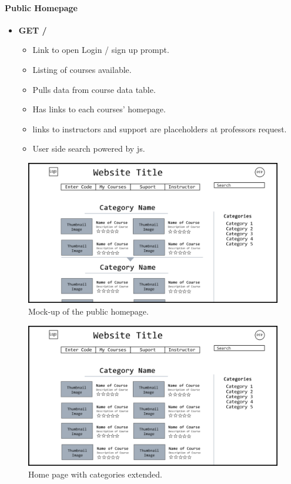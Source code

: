\documentclass{article}
\begin{document}
\newpage

\paragraph{Public Homepage}
\vspace{\baselineskip}
\begin{itemize}
    \item \textbf{GET /}
    \begin{itemize}
        \item Link to open Login / sign up prompt.
        \item Listing of courses available.
        \item Pulls data from course data table.
        \item Has links to each courses' homepage.
        \item links to instructors and support are placeholders at professors request.
        \item User side search powered by js.
    \end{itemize}
\end{itemize}
\begin{figure}[h!]
    \caption{Mock-up of the public homepage.}
    \includegraphics[width=\textwidth]{home_page}
\end{figure}
\begin{figure}[h!]
    \caption{Home page with categories extended.}
    \includegraphics[width=\textwidth]{hompage_expanded}
\end{figure}
\end{document}
